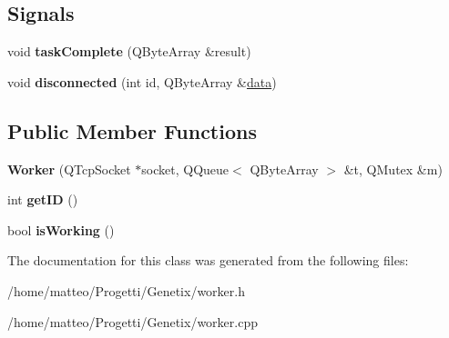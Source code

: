 \subsection*{Signals}
\begin{DoxyCompactItemize}
\item 
\mbox{\label{classWorker_a1227c92cf569cf361a7a69f13a2e3e1b}} 
void {\bfseries task\+Complete} (Q\+Byte\+Array \&result)
\item 
\mbox{\label{classWorker_a94421023a53a3c39d2913ba64980571d}} 
void {\bfseries disconnected} (int id, Q\+Byte\+Array \&\hyperlink{structdata}{data})
\end{DoxyCompactItemize}
\subsection*{Public Member Functions}
\begin{DoxyCompactItemize}
\item 
\mbox{\label{classWorker_af1f07301bce34c5253ac2c2a86945154}} 
{\bfseries Worker} (Q\+Tcp\+Socket $\ast$socket, Q\+Queue$<$ Q\+Byte\+Array $>$ \&t, Q\+Mutex \&m)
\item 
\mbox{\label{classWorker_a0e11ac035f24a638ab7251f3a3961ac1}} 
int {\bfseries get\+ID} ()
\item 
\mbox{\label{classWorker_aea9ff3ae949ac3a55ceb51999605887a}} 
bool {\bfseries is\+Working} ()
\end{DoxyCompactItemize}


The documentation for this class was generated from the following files\+:\begin{DoxyCompactItemize}
\item 
/home/matteo/\+Progetti/\+Genetix/worker.\+h\item 
/home/matteo/\+Progetti/\+Genetix/worker.\+cpp\end{DoxyCompactItemize}
